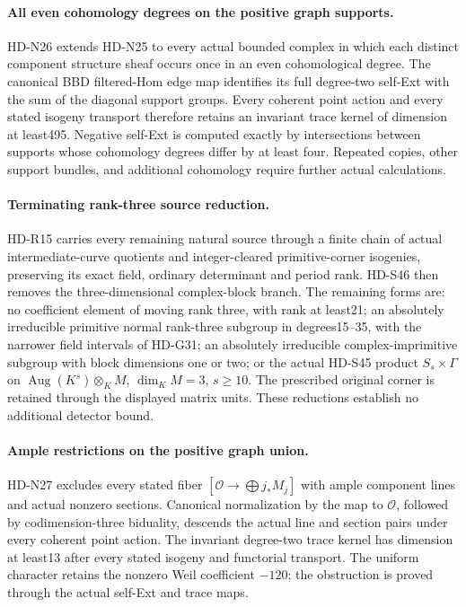 \paragraph{All even cohomology degrees on the positive graph supports.}
HD-N26 extends HD-N25 to every actual bounded complex in
which each distinct component structure sheaf occurs once
in an even cohomological degree. The canonical BBD filtered-Hom
edge map identifies its full degree-two self-Ext with the
sum of the diagonal support groups. Every coherent point
action and every stated isogeny transport therefore retains
an invariant trace kernel of dimension at least495.
Negative self-Ext is computed exactly by intersections
between supports whose cohomology degrees differ by at
least four. Repeated copies, other support bundles, and
additional cohomology require further actual calculations.


\paragraph{Terminating rank-three source reduction.}
HD-R15 carries every remaining natural source through a finite
chain of actual intermediate-curve quotients and integer-cleared
primitive-corner isogenies, preserving its exact field,
ordinary determinant and period rank. HD-S46 then removes the
three-dimensional complex-block branch. The remaining forms are:
no coefficient element of moving rank three, with rank at least21;
an absolutely irreducible primitive normal rank-three subgroup
in degrees15--35, with the narrower field intervals of HD-G31;
an absolutely irreducible complex-imprimitive subgroup with
block dimensions one or two; or the actual HD-S45 product
\(S_s\times\Gamma\) on
\(\operatorname{Aug}(K^s)\otimes_K M\), \(\dim_KM=3\),
\(s\ge10\). The prescribed original corner is retained through
the displayed matrix units. These reductions establish no
additional detector bound.

\paragraph{Ample restrictions on the positive graph union.}
HD-N27 excludes every stated fiber
\([\mathcal O\to\bigoplus j_*M_j]\) with ample component
lines and actual nonzero sections. Canonical normalization by
the map to \(\mathcal O\), followed by codimension-three
biduality, descends the actual line and section pairs under
every coherent point action. The invariant degree-two trace
kernel has dimension at least13 after every stated isogeny
and functorial transport. The uniform character retains the
nonzero Weil coefficient \(-120\); the obstruction is proved
through the actual self-Ext and trace maps.


